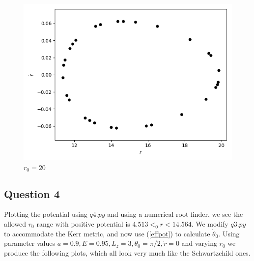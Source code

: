 \documentclass[10pt,a4paper]{report}
\begin{document}
\begin{figure}[!ht]
\begin{minipage}[b]{0.5\linewidth}
\centering
\includegraphics[width=\textwidth]{3b/r0=20,E=0.97,L=4.png}
\caption{$r_0=20$}
\label{fig:figure1}
\end{minipage}
\end{figure}



\newpage

\subsection*{Question 4}

Plotting the potential using $q4.py$ and using a numerical root finder, we see the allowed $r_0$ range with positive potential is $4.513<_0r<14.564$. We modify $q3.py$ to accommodate the Kerr metric, and now use (\ref{effpot}) to calculate $\dot{\theta}_0$. Using parameter values $a=0.9, E=0.95, L_z=3, \theta_0=\pi/2, \dot{r}=0$ and varying $r_0$ we produce the following plots, which all look very much like the Schwartzchild ones.
\end{document}
